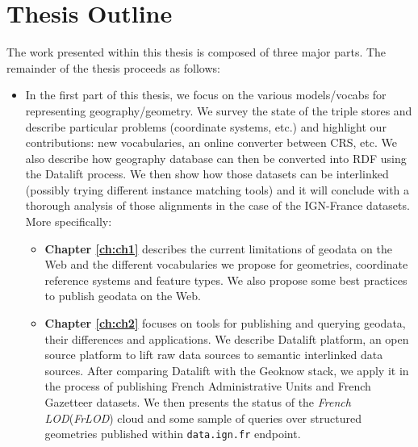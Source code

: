 \section{Thesis Outline}
\label{sec:thesis-structure}

The work presented within this thesis is composed of three major parts. The remainder of the thesis proceeds as follows:

\begin{itemize}
\item In the first part of this thesis, we focus on the various models/vocabs for representing geography/geometry. We survey the state of the triple stores and describe particular problems (coordinate systems, etc.) and highlight our contributions: new vocabularies, an online converter between CRS, etc. We also describe how geography database can then be converted into RDF using the Datalift process. We then show how those datasets can be interlinked (possibly trying different instance matching tools) and it will conclude with a thorough analysis of those alignments in the case of the IGN-France datasets. More specifically:

 \begin{itemize}
  \item \textbf{Chapter \ref{ch:ch1}} describes the current limitations of geodata on the Web and the different vocabularies we propose for geometries, coordinate reference systems and feature  types. We also propose  some best practices to publish geodata on the Web.
  \item \textbf{Chapter \ref{ch:ch2}} focuses on tools for publishing and querying geodata, their differences and applications. We describe Datalift platform, an open source platform to lift raw data sources to semantic interlinked data sources. After comparing Datalift with the Geoknow stack, we apply it in the process of publishing French Administrative Units and French Gazetteer datasets. We then presents the status of the \textit{French LOD}(\textit{FrLOD}) cloud and some sample of queries over structured geometries published within \texttt{data.ign.fr} endpoint. 
 \end{itemize}


\end{itemize}
